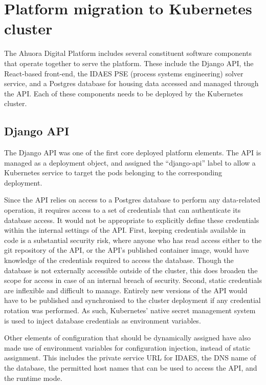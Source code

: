 \section{Platform migration to Kubernetes cluster}

The Ahuora Digital Platform includes several constituent software components that operate together to serve the platform. These include the Django API, the React-based front-end, the IDAES PSE (process systems engineering) solver service, and a Postgres database for housing data accessed and managed through the API. Each of these components needs to be deployed by the Kubernetes cluster.

\subsection{Django API}

The Django API was one of the first core deployed platform elements. The API is managed as a deployment object, and assigned the ``django-api'' label to allow a Kubernetes service to target the pods belonging to the corresponding deployment. 

Since the API relies on access to a Postgres database to perform any data-related operation, it requires access to a set of credentials that can authenticate its database access. It would not be appropriate to explicitly define these credentials within the internal settings of the API. First, keeping credentials available in code is a substantial security risk, where anyone who has read access either to the git repository of the API, or the API's published container image, would have knowledge of the credentials required to access the database. Though the database is not externally accessible outside of the cluster, this does broaden the scope for access in case of an internal breach of security. Second, static credentials are inflexible and difficult to manage. Entirely new versions of the API would have to be published and synchronised to the cluster deployment if any credential rotation was performed. As such, Kubernetes' native secret management system is used to inject database credentials as environment variables.

Other elements of configuration that should be dynamically assigned have also made use of environment variables for configuration injection, instead of static assignment. This includes the private service URL for IDAES, the DNS name of the database, the permitted host names that can be used to access the API, and the runtime mode.

